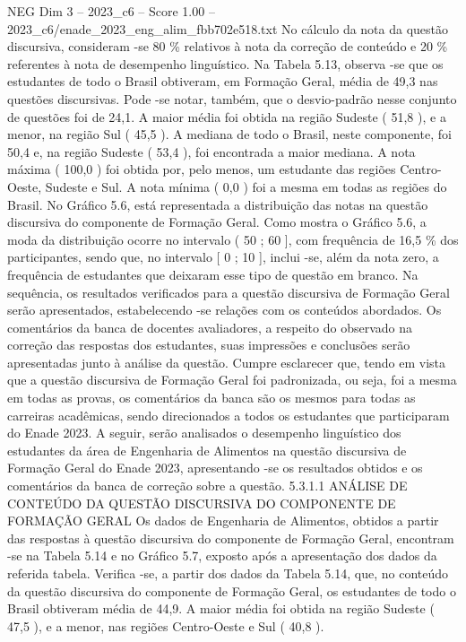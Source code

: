 \begin{textsample}{NEG Dim 3 – 2023\_c6 – Score 1.00 – 2023\_c6/enade\_2023\_eng\_alim\_fbb702e518.txt}
No cálculo da nota da questão discursiva, consideram -se 80 \% relativos à nota da correção de conteúdo e 20 \% referentes à nota de desempenho linguístico.
Na Tabela 5.13, observa -se que os estudantes de todo o Brasil obtiveram, em Formação Geral, média de 49,3 nas questões discursivas.
Pode -se notar, também, que o desvio-padrão nesse conjunto de questões foi de 24,1.
A maior média foi obtida na região Sudeste ( 51,8 ), e a menor, na região Sul ( 45,5 ).
A mediana de todo o Brasil, neste componente, foi 50,4 e, na região Sudeste ( 53,4 ), foi encontrada a maior mediana.
A nota máxima ( 100,0 ) foi obtida por, pelo menos, um estudante das regiões Centro-Oeste, Sudeste e Sul.
A nota mínima ( 0,0 ) foi a mesma em todas as regiões do Brasil.
No Gráfico 5.6, está representada a distribuição das notas na questão discursiva do componente de Formação Geral.
Como mostra o Gráfico 5.6, a moda da distribuição ocorre no intervalo ( 50 ; 60 ], com frequência de 16,5 \% dos participantes, sendo que, no intervalo [ 0 ; 10 ], inclui -se, além da nota zero, a frequência de estudantes que deixaram esse tipo de questão em branco.
Na sequência, os resultados verificados para a questão discursiva de Formação Geral serão apresentados, estabelecendo -se relações com os conteúdos abordados.
Os comentários da banca de docentes avaliadores, a respeito do observado na correção das respostas dos estudantes, suas impressões e conclusões serão apresentadas junto à análise da questão.
Cumpre esclarecer que, tendo em vista que a questão discursiva de Formação Geral foi padronizada, ou seja, foi a mesma em todas as provas, os comentários da banca são os mesmos para todas as carreiras acadêmicas, sendo direcionados a todos os estudantes que participaram do Enade 2023.
A seguir, serão analisados o desempenho linguístico dos estudantes da área de Engenharia de Alimentos na questão discursiva de Formação Geral do Enade 2023, apresentando -se os resultados obtidos e os comentários da banca de correção sobre a questão. 5.3.1.1 ANÁLISE DE CONTEÚDO DA QUESTÃO DISCURSIVA DO COMPONENTE DE FORMAÇÃO GERAL Os dados de Engenharia de Alimentos, obtidos a partir das respostas à questão discursiva do componente de Formação Geral, encontram -se na Tabela 5.14 e no Gráfico 5.7, exposto após a apresentação dos dados da referida tabela.
Verifica -se, a partir dos dados da Tabela 5.14, que, no conteúdo da questão discursiva do componente de Formação Geral, os estudantes de todo o Brasil obtiveram média de 44,9.
A maior média foi obtida na região Sudeste ( 47,5 ), e a menor, nas regiões Centro-Oeste e Sul ( 40,8 ).

\end{textsample}
